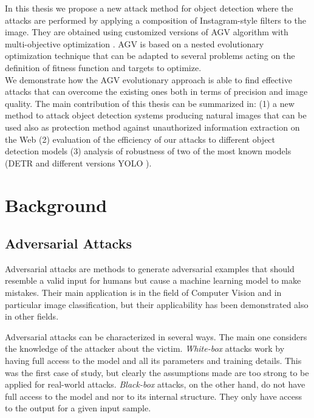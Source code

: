In this thesis we propose a new attack method for object detection where the attacks are performed by applying a composition of Instagram-style filters to the image. They are obtained using customized versions of AGV algorithm with multi-objective optimization \cite{agv1} \cite{agv2}. AGV is based on a nested evolutionary optimization technique that can be adapted to several problems acting on the definition of fitness function and targets to optimize. \\
We demonstrate how the AGV evolutionary approach is able to find effective attacks that can overcome the existing ones both in terms of precision and image quality. The main contribution of this thesis can be summarized in: (1) a new method to attack object detection systems producing natural images that can be used also as protection method against unauthorized information extraction on the Web (2) evaluation of the efficiency of our attacks to different object detection models (3) analysis of robustness of two of the most known models (DETR \cite{detr_paper} and different versions YOLO \cite{yolov3, yolov4}). 



\chapter{Background} \label{sec:background}

\section{Adversarial Attacks}
Adversarial attacks are methods to generate adversarial examples that should resemble a valid input for humans but cause a machine learning model to make mistakes.
Their main application is in the field of Computer Vision and in particular image classification, but their applicability has been demonstrated also in other fields. %

Adversarial attacks can be characterized in several ways. The main one considers the knowledge of the attacker about the victim. \textit{White-box} attacks work by having full access to the model and all its parameters and training details. This was the first case of study, but clearly the assumptions made are too strong to be applied for real-world attacks. 
\textit{Black-box} attacks, on the other hand, do not have full access to the model and nor to its internal structure.
They only have access to the output for a given input sample.

